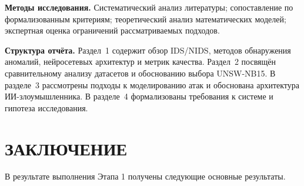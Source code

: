 \documentclass[14pt, a4paper]{extarticle}
\begin{document}
\textbf{Методы исследования.} Систематический анализ литературы;
сопоставление по формализованным критериям; теоретический анализ
математических моделей; экспертная оценка ограничений рассматриваемых
подходов.

\textbf{Структура отчёта.} Раздел~1 содержит обзор IDS/NIDS, методов
обнаружения аномалий, нейросетевых архитектур и метрик качества.
Раздел~2 посвящён сравнительному анализу датасетов и обоснованию выбора
UNSW-NB15. В разделе~3 рассмотрены подходы к моделированию атак и
обоснована архитектура ИИ-злоумышленника. В разделе~4 формализованы
требования к системе и гипотеза исследования.

\newpage






\section*{ЗАКЛЮЧЕНИЕ}

В результате выполнения Этапа 1 получены следующие основные результаты.
\end{document}
